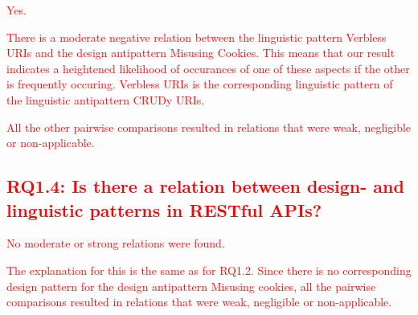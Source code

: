 \textcolor{red}{Yes.}

\textcolor{red}{
There is a moderate negative relation between the linguistic pattern Verbless URIs and the design antipattern Misusing Cookies. This means that our result indicates a heightened likelihood of occurances of one of these aspects if the other is frequently occuring. Verbless URIs is the corresponding linguistic pattern of the linguistic antipattern CRUDy URIs. 
}

\textcolor{red}{
All the other pairwise comparisons resulted in relations that were weak, negligible or non-applicable. 
}

\subsection{\textcolor{red}{RQ1.4: Is there a relation between design- and linguistic patterns in RESTful APIs?}}

\textcolor{red}{No moderate or strong relations were found.}

\textcolor{red}{
The explanation for this is the same as for RQ1.2. Since there is no corresponding design pattern for the design antipattern Misusing cookies, all the pairwise comparisons resulted in relations that were weak, negligible or non-applicable. 
}

\newpage